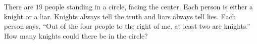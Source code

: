 There are $19$ people standing in a circle, facing the center. Each person is either a knight or a liar. Knights always tell the truth and liars always tell lies. Each person says, ``Out of the four people to the right of me, at least two are knights.'' How many knights could there be in  the circle?
